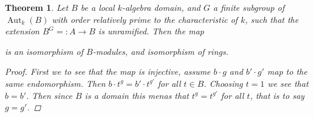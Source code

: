 \documentclass[11pt, a4paper, english]{article}
\numberwithin{prop}{section}
\numberwithin{lemma}{section}
\newtheorem{theorem}{Theorem}
\numberwithin{theorem}{section}
\numberwithin{defin}{section}
\numberwithin{example}{section}
\DeclareMathOperator{\End}{End}
\DeclareMathOperator{\Aut}{Aut}
\begin{document}
\begin{theorem}
Let $B$ be a local $k$-algebra domain, and $G$ a finite subgroup of $\Aut_k(B)$ with order relatively prime to the characteristic of $k$, such that the extension $B^G =:A \to B$ is unramified. Then the map
\begin{center}
\end{center}
is an isomorphism of $B$-modules, and isomorphism of rings.

\begin{proof}
First we to see that the map is injective, assume $b \cdot g$ and $b' \cdot g'$ map to the same endomorphism. Then $b \cdot t^g = b' \cdot t^{g'}$ for all $t \in B$. Choosing $t=1$ we see that $b = b'$. Then since $B$ is a domain this menas that $t^g = t^{g'}$ for all $t$, that is to say $g = g'$.


\end{proof}
\end{theorem}
\end{document}
